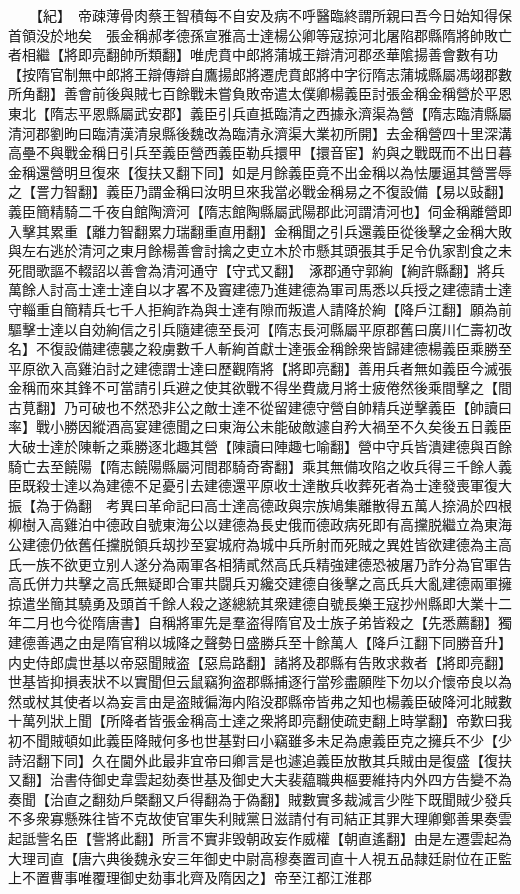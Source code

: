 　　【紀】　帝疎薄骨肉蔡王智積每不自安及病不呼醫臨終謂所親曰吾今日始知得保首領没於地矣　張金稱郝孝德孫宣雅高士達楊公卿等寇掠河北屠陷郡縣隋將帥敗亡者相繼【將即亮翻帥所類翻】唯虎賁中郎將蒲城王辯清河郡丞華隂揚善會數有功【按隋官制無中郎將王辯傳辯自鷹揚郎將遷虎賁郎將中字衍隋志蒲城縣屬馮翊郡數所角翻】善會前後與賊七百餘戰未嘗負敗帝遣太僕卿楊義臣討張金稱金稱營於平恩東北【隋志平恩縣屬武安郡】義臣引兵直抵臨清之西據永濟渠為營【隋志臨清縣屬清河郡劉昫曰臨清漢清泉縣後魏改為臨清永濟渠大業初所開】去金稱營四十里深溝高壘不與戰金稱日引兵至義臣營西義臣勒兵擐甲【擐音宦】約與之戰既而不出日暮金稱還營明旦復來【復扶又翻下同】如是月餘義臣竟不出金稱以為怯屢逼其營詈辱之【詈力智翻】義臣乃謂金稱曰汝明旦來我當必戰金稱易之不復設備【易以䜴翻】義臣簡精騎二千夜自館陶濟河【隋志館陶縣屬武陽郡此河謂清河也】伺金稱離營即入擊其累重【離力智翻累力瑞翻重直用翻】金稱聞之引兵還義臣從後擊之金稱大敗與左右逃於清河之東月餘楊善會討擒之吏立木於市懸其頭張其手足令仇家割食之未死間歌謳不輟詔以善會為清河通守【守式又翻】　涿郡通守郭絢【絢許縣翻】將兵萬餘人討高士達士達自以才畧不及竇建德乃進建德為軍司馬悉以兵授之建德請士達守輜重自簡精兵七千人拒絢詐為與士達有隙而叛遣人請降於絢【降戶江翻】願為前驅擊士達以自効絢信之引兵隨建德至長河【隋志長河縣屬平原郡舊曰廣川仁壽初改名】不復設備建德襲之殺虜數千人斬絢首獻士達張金稱餘衆皆歸建德楊義臣乘勝至平原欲入高雞泊討之建德謂士達曰歷觀隋將【將即亮翻】善用兵者無如義臣今滅張金稱而來其鋒不可當請引兵避之使其欲戰不得坐費歲月將士疲倦然後乘間擊之【間古莧翻】乃可破也不然恐非公之敵士達不從留建德守營自帥精兵逆擊義臣【帥讀曰率】戰小勝因縱酒高宴建德聞之曰東海公未能破敵遽自矜大禍至不久矣後五日義臣大破士達於陳斬之乘勝逐北趣其營【陳讀曰陣趣七喻翻】營中守兵皆潰建德與百餘騎亡去至饒陽【隋志饒陽縣屬河間郡騎奇寄翻】乘其無備攻陷之收兵得三千餘人義臣既殺士達以為建德不足憂引去建德還平原收士達散兵收葬死者為士達發喪軍復大振【為于偽翻　考異曰革命記曰高士達高德政與宗族鳩集離散得五萬人捺渦於四根柳樹入高雞泊中德政自號東海公以建德為長史俄而德政病死即有高攩脱繼立為東海公建德仍依舊任攩脱領兵刼抄至宴城府為城中兵所射而死賊之異姓皆欲建德為主高氏一族不欲更立别人遂分為兩軍各相猜貳然高氏兵精強建德恐被屠乃詐分為官軍告高氏併力共擊之高氏無疑即合軍共闘兵刃纔交建德自後擊之高氏兵大亂建德兩軍擁掠遣坐簡其驍勇及頭首千餘人殺之遂總統其衆建德自號長樂王寇抄州縣即大業十二年二月也今從隋唐書】自稱將軍先是羣盗得隋官及士族子弟皆殺之【先悉薦翻】獨建德善遇之由是隋官稍以城降之聲勢日盛勝兵至十餘萬人【降戶江翻下同勝音升】　内史侍郎虞世基以帝惡聞賊盗【惡烏路翻】諸將及郡縣有告敗求救者【將即亮翻】世基皆抑損表狀不以實聞但云鼠竊狗盗郡縣捕逐行當殄盡願陛下勿以介懷帝良以為然或杖其使者以為妄言由是盗賊徧海内陷没郡縣帝皆弗之知也楊義臣破降河北賊數十萬列狀上聞【所降者皆張金稱高士達之衆將即亮翻使疏吏翻上時掌翻】帝歎曰我初不聞賊頓如此義臣降賊何多也世基對曰小竊雖多未足為慮義臣克之擁兵不少【少詩沼翻下同】久在閫外此最非宜帝曰卿言是也遽追義臣放散其兵賊由是復盛【復扶又翻】治書侍御史韋雲起劾奏世基及御史大夫裴藴職典樞要維持内外四方告變不為奏聞【治直之翻劾戶槩翻又戶得翻為于偽翻】賊數實多裁減言少陛下既聞賊少發兵不多衆寡懸殊往皆不克故使官軍失利賊黨日滋請付有司結正其罪大理卿鄭善果奏雲起詆訾名臣【訾將此翻】所言不實非毁朝政妄作威權【朝直遙翻】由是左遷雲起為大理司直【唐六典後魏永安三年御史中尉高穆奏置司直十人視五品隸廷尉位在正監上不置曹事唯覆理御史劾事北齊及隋因之】帝至江都江淮郡